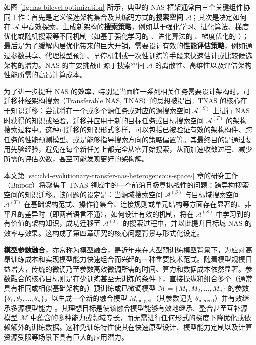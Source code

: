 \documentclass[../main.tex]{subfiles}
\begin{document}
如图 \ref{fig:nas-bilevel-optimization} 所示，典型的 NAS 框架通常由三个关键组件协同工作：首先是定义候选架构集合及其编码方式的\textbf{搜索空间} $\mathcal{A}$；其次是决定如何在 $\mathcal{A}$ 中高效探索、生成新架构的\textbf{搜索策略}，例如基于强化学习、进化算法、梯度优化或随机搜索等不同机制（如基于强化学习的 \cite{neuralarchitecturesearch_zoph_2017}、进化算法的 \cite{regularizedevolutionimage_real_2019}、梯度优化的 \cite{dartsdifferentiablearchitecture_liu_2019}）；最后是为了缓解内层优化带来的巨大开销，需要设计有效的\textbf{性能评估策略}，例如通过参数共享\cite{efficientneuralarchitecture_pham_2018}、代理模型预测\cite{neuralpredictorneural_wen_2020}、早停机制或一次性训练\cite{singlepathone_guo_2020,cellbasedfast_dong_2023}等手段来快速估计或比较候选架构的潜力。NAS 的主要挑战正源于搜索空间 $\mathcal{A}$ 的离散性、高维性以及评估架构性能所需的高昂计算成本\cite{neuralarchitecturesearch_elsken_2019,nasbench101_ying_2019}。

为了进一步提升 NAS 的效率，特别是当面临一系列相关任务需要设计架构时，可迁移神经架构搜索（Transferable NAS, TNAS）的思想被提出。TNAS 的核心在于知识迁移：尝试将在一个或多个源任务或对应的源搜索空间 $\mathcal{A}^{(S)}$ 上进行 NAS 时获得的知识或经验，迁移并应用于新的目标任务或目标搜索空间 $\mathcal{A}^{(T)}$ 的架构搜索过程中。这种可迁移的知识形式多样，可以包括已被验证有效的架构构件、跨任务的性能预测模型、或是能够指导搜索方向的策略偏置等\cite{learningtransferablearchitectures_zoph_2018,neuralarchitecturetransfer_lu_2021,archgraphacyclic_huang_2022,generalpurposetransferable_han_2023}。其最终目的是通过复用先验经验，避免在每个新任务上都完全从零开始搜索，从而加速收敛过程、减少所需的评估次数，甚至可能发现更好的架构解。

本文第 \ref{sec:ch4-evolutionary-transfer-nas-heterogeneous-spaces} 章的研究工作（\textsc{Bridge}）将聚焦于 TNAS 领域中的一个前沿且极具挑战性的问题：跨异构搜索空间的知识迁移。该问题的设定是：当源域搜索空间 $\mathcal{A}^{(S)}$ 与目标域搜索空间 $\mathcal{A}^{(T)}$ 在基础架构范式、操作符集合、连接规则或单元结构等方面存在显著的、非平凡的差异时（即两者语言不通），如何设计有效的机制，将在 $\mathcal{A}^{(S)}$ 中学习到的有价值的架构知识，成功迁移至 $\mathcal{A}^{(T)}$ 的搜索过程中，并以此提升目标域 NAS 的效率与效果。这构成了第四章研究的核心问题背景与形式化设定。

\label{sec:ch2-3-3-model-parameter-fusion}

\textbf{模型参数融合}，亦常称为模型融合，是近年来在大型预训练模型背景下，为应对高昂训练成本和实现模型能力快速组合而兴起的一种重要技术范式。随着模型规模日益增大，传统的微调乃至参数高效微调所需的时间、算力和数据成本依然显著。参数融合的核心目标则是在少训练甚至无训练的条件下，直接操纵和组合多个（通常具有相同或相似基础架构的）预训练或已微调模型 $\mathcal{M} = \{M_1, M_2, \dots, M_n\}$ 的参数 $\{\theta_1, \theta_2, \dots, \theta_n\}$，以生成一个新的融合模型 $M_\mathrm{merged}$（其参数记为 $\theta_\mathrm{merged}$）并有效继承多源模型能力 \cite{modelsoupsaveraging_wortsman_2022,mergingmodelsfisher_matena_2022,editingmodelstask_ilharco_2023}。其理想目标是使该融合模型能够有效地继承、整合甚至互补源模型 $\mathcal{M}$ 中蕴含的多种能力或领域专长，而无需进行任何形式的梯度下降优化或依赖额外的训练数据。这种免训练特性使其在快速原型设计、模型能力定制以及计算资源受限等场景下具有巨大的应用潜力。
\end{document}
